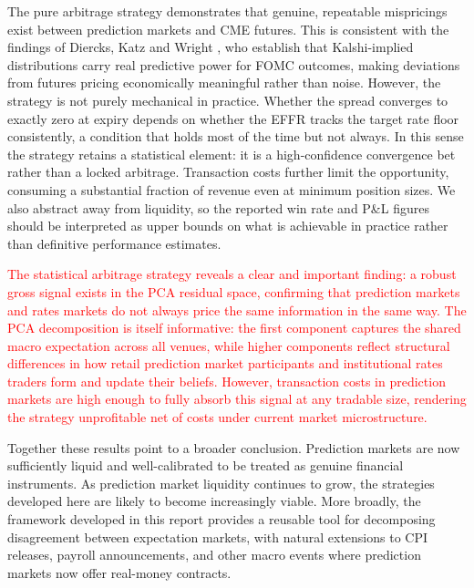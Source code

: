 The pure arbitrage strategy demonstrates that genuine, repeatable mispricings exist between prediction markets and CME futures. This is consistent with the findings of Diercks, Katz and Wright \cite{diercks2026kalshi}, who establish that Kalshi-implied distributions carry real predictive power for FOMC outcomes, making deviations from futures pricing economically meaningful rather than noise. However, the strategy is not purely mechanical in practice. Whether the spread converges to exactly zero at expiry depends on whether the EFFR tracks the target rate floor consistently, a condition that holds most of the time but not always. In this sense the strategy retains a statistical element: it is a high-confidence convergence bet rather than a locked arbitrage. Transaction costs further limit the opportunity, consuming a substantial fraction of revenue even at minimum position sizes. We also abstract away from liquidity, so the reported win rate and P\&L figures should be interpreted as upper bounds on what is achievable in practice rather than definitive performance estimates.

\textcolor{red}{The statistical arbitrage strategy reveals a clear and important finding: a robust gross signal exists in the PCA residual space, confirming that prediction markets and rates markets do not always price the same information in the same way. The PCA decomposition is itself informative: the first component captures the shared macro expectation across all venues, while higher components reflect structural differences in how retail prediction market participants and institutional rates traders form and update their beliefs. However, transaction costs in prediction markets are high enough to fully absorb this signal at any tradable size, rendering the strategy unprofitable net of costs under current market microstructure.}

Together these results point to a broader conclusion. Prediction markets are now sufficiently liquid and well-calibrated to be treated as genuine financial instruments. As prediction market liquidity continues to grow, the strategies developed here are likely to become increasingly viable. More broadly, the framework developed in this report provides a reusable tool for decomposing disagreement between expectation markets, with natural extensions to CPI releases, payroll announcements, and other macro events where prediction markets now offer real-money contracts.


